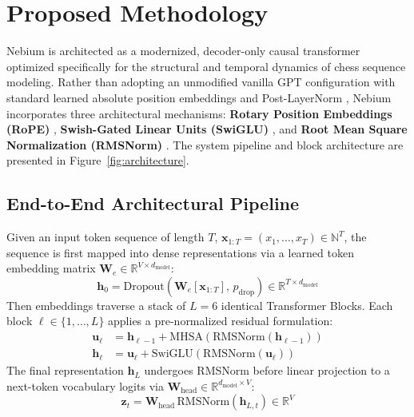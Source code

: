 \section{Proposed Methodology}
\label{sec:proposed_method}

Nebium is architected as a modernized, decoder-only causal transformer \parencite{vaswani2017attention} optimized specifically for the structural and temporal dynamics of chess sequence modeling. Rather than adopting an unmodified vanilla GPT configuration with standard learned absolute position embeddings and Post-LayerNorm \parencite{deleo2022learning}, Nebium incorporates three architectural mechanisms: \textbf{Rotary Position Embeddings (RoPE)} \parencite{su2024roformer}, \textbf{Swish-Gated Linear Units (SwiGLU)} \parencite{shazeer2020glu}, and \textbf{Root Mean Square Normalization (RMSNorm)} \parencite{zhang2019root}. The system pipeline and block architecture are presented in Figure~\ref{fig:architecture}.



\subsection{End-to-End Architectural Pipeline}
\label{sec:arch_pipeline}
Given an input token sequence of length $T$, $\mathbf{x}_{1:T} = (x_1, \dots, x_T) \in \mathbb{N}^T$, the sequence is first mapped into dense representations via a learned token embedding matrix $\mathbf{W}_e \in \mathbb{R}^{V \times d_{\text{model}}}$:
\begin{equation}
    \mathbf{h}_0 = \text{Dropout}\left(\mathbf{W}_e[\mathbf{x}_{1:T}], \, p_{\text{drop}}\right) \in \mathbb{R}^{T \times d_{\text{model}}}
\end{equation}
Then embeddings traverse a stack of $L = 6$ identical Transformer Blocks. Each block $\ell \in \{1, \dots, L\}$ applies a pre-normalized residual formulation:
\begin{align}
    \mathbf{u}_\ell &= \mathbf{h}_{\ell-1} + \text{MHSA}\left(\text{RMSNorm}(\mathbf{h}_{\ell-1})\right) \\
    \mathbf{h}_\ell &= \mathbf{u}_\ell + \text{SwiGLU}\left(\text{RMSNorm}(\mathbf{u}_\ell)\right)
\end{align}
The final representation $\mathbf{h}_L$ undergoes RMSNorm before linear projection to a next-token vocabulary logits via $\mathbf{W}_{\text{head}} \in \mathbb{R}^{d_{\text{model}} \times V}$:
\begin{equation}
    \mathbf{z}_t = \mathbf{W}_{\text{head}} \, \text{RMSNorm}(\mathbf{h}_{L, t}) \in \mathbb{R}^V
\end{equation}

